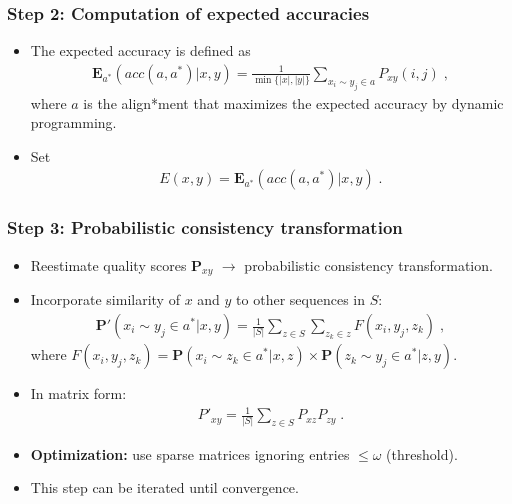 \begin{frame}
    \frametitle{Step 2: Computation of expected accuracies}
    \begin{itemize}
        \item The expected accuracy is defined as
        \begin{align*}
            \pmb{E}_{a^*} (acc(a,a^*)|x,y) = \frac{1}{\min{\{|x|,|y|\}}} \sum_{x_i\sim y_j \in a} P_{xy}(i,j) \;,
        \end{align*}
        where $a$ is the align*ment that maximizes the expected accuracy by dynamic programming.
        \item Set 
        \begin{align}\label{eq:score}
            E(x,y) = \pmb{E}_{a^*} (acc(a,a^*)|x,y) \;.
        \end{align}
    \end{itemize}
\end{frame}

\begin{frame}
    \frametitle{Step 3: Probabilistic consistency transformation}
    \begin{itemize}
        \item Reestimate quality scores $\pmb{P}_{xy}$ $\rightarrow$ probabilistic consistency transformation.
        \item Incorporate similarity of $x$ and $y$ to other sequences in $S$:
        \begin{align*}
            {\pmb{P}}'(x_i \sim y_j \in a^* | x, y) = \frac{1}{|S|} \sum_{z\in S} \sum_{z_k \in z} F(x_i, y_j, z_k) \;,
        \end{align*}
        where $F(x_i, y_j, z_k) =  {\pmb{P}}(x_i \sim z_k \in a^* | x, z) \times {\pmb{P}}(z_k \sim y_j \in a^* | z, y) $.
        \item In matrix form:
        \begin{align*}
            {P'}_{xy} = \frac{1}{|S|} \sum_{z\in S} P_{xz}P_{zy} \;.
        \end{align*}
        \item \textbf{Optimization: }use sparse matrices ignoring entries $\leq \omega$ (threshold).
        \item This step can be iterated until convergence.
    \end{itemize}
\end{frame}

